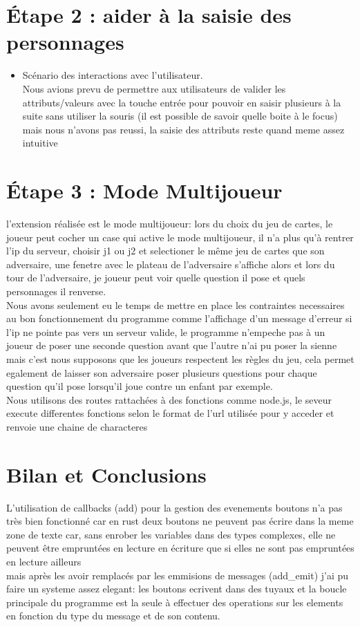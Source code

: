 \documentclass[a4paper]{article}
\begin{document}
\section{Étape 2 : aider  à la saisie  des personnages}

\begin{itemize}
\item
  Scénario des interactions avec l'utilisateur.\\
  Nous avions prevu de permettre aux utilisateurs de valider les attributs/valeurs avec la touche entrée pour pouvoir en saisir plusieurs à la suite sans utiliser la souris (il est possible de savoir quelle boite à le focus) mais nous n'avons pas reussi, la saisie des attributs reste quand meme assez intuitive
\end{itemize}

\section{Étape 3 : Mode Multijoueur}

l'extension réalisée est le mode multijoueur: lors du choix du jeu de cartes, le joueur peut cocher un case qui active le mode multijoueur, il n'a plus qu'à rentrer l'ip du serveur, choisir j1 ou j2 et selectioner le même jeu de cartes que son adversaire, une fenetre avec le plateau de l'adversaire s'affiche alors et lors du tour de l'adversaire, je joueur peut voir quelle question il pose et quels personnages il renverse.\\
Nous avons seulement eu le temps de mettre en place les contraintes necessaires au bon fonctionnement du programme comme l'affichage d'un message d'erreur si l'ip ne pointe pas vers un serveur valide, le programme n'empeche pas à un joueur de poser une seconde question avant que l'autre n'ai pu poser la sienne mais c'est nous supposons que les joueurs respectent les règles du jeu, cela permet egalement de laisser son adversaire poser plusieurs questions pour chaque question qu'il pose lorsqu'il joue contre un enfant par exemple.\\

Nous utilisons des routes rattachées à des fonctions comme node.js, le seveur execute differentes fonctions selon le format de l'url utilisée pour y acceder et renvoie une chaine de characteres\\

\section{Bilan et Conclusions}

L'utilisation de callbacks (add) pour la gestion des evenements boutons n'a pas très bien fonctionné car en rust deux boutons ne peuvent pas écrire dans la meme zone de texte car, sans enrober les variables dans des types complexes, elle ne peuvent être empruntées en lecture en écriture que si elles ne sont pas empruntées en lecture ailleurs \\
mais après les avoir remplacés par les emmisions de messages (add\_emit) j'ai pu faire un systeme assez elegant: les boutons ecrivent dans des tuyaux et la boucle principale du programme est la seule à effectuer des operations sur les elements en fonction du type du message et de son contenu.
\end{document}
